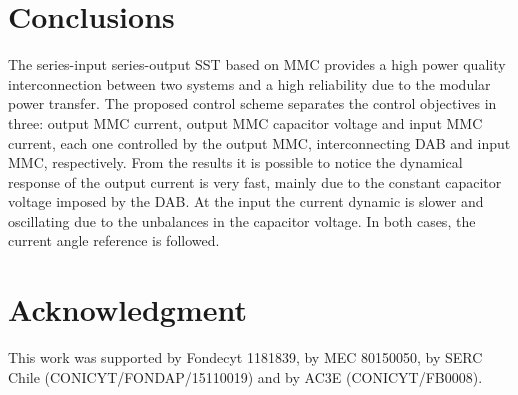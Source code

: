 \documentclass[conference]{IEEEtran}
\begin{document}
 \section{Conclusions}
The series-input series-output SST based on MMC provides a high power quality interconnection between two systems and a high reliability due to the modular power transfer. The proposed control scheme separates the control objectives in three: output MMC current, output MMC capacitor voltage and input MMC current, each one controlled by the output MMC, interconnecting DAB and input MMC, respectively. From the results it is possible to notice the dynamical response of the output current is very fast, mainly due to the constant capacitor voltage imposed by the DAB. At the input the current dynamic is slower and oscillating due to the unbalances  in the capacitor voltage. In both cases, the current angle reference is  followed. 



\section*{Acknowledgment}
This work was supported by Fondecyt 1181839, by MEC 80150050, by SERC Chile (CONICYT/FONDAP/15110019) and by AC3E (CONICYT/FB0008). 






\vspace{12pt}
\end{document}
